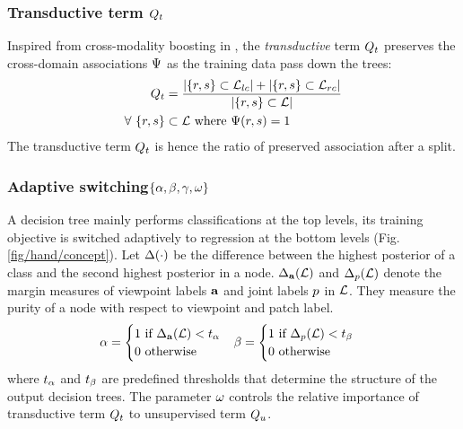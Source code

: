 \subsubsection{Transductive term $Q_{t}$} 
Inspired from cross-modality boosting in \cite{Bronstein2010}, 
the \emph{transductive} term $Q_{t}$ preserves the cross-domain associations $\mathrm{\Psi}$ as the training data pass down the trees: 
\begin{equation}
	\begin{split}
	Q_{t} &= 
	\frac{|\{r,s\} \subset \mathcal{L}_{lc}| +  
	|\{r,s\} \subset \mathcal{L}_{rc}|}{|\{r,s\} \subset \mathcal{L}|} \\   
	\forall\ \{r,s\} &\subset \mathcal{L} \mbox{ where } \mathrm{\Psi}(r,s) = 1
	\end{split}
	\label{eq:pairterm}
\end{equation}
The transductive term $Q_{t}$ is hence the ratio of preserved association after a split. \\
\subsubsection{Adaptive switching$\{\alpha, \beta, \gamma, \omega\}$} 
A decision tree mainly performs classifications at the top levels, its training objective is switched adaptively to regression at the bottom levels (Fig. \ref{fig/hand/concept}). 
Let $\Delta(\cdot)$ be the difference between the highest posterior of a class and the second highest posterior in a node. $\Delta_{\mathbf{a}}(\mathcal{L})$ and $\Delta_{p}(\mathcal{L})$ denote the margin measures of viewpoint labels $\mathbf{a}$ and joint labels $p$ in $\mathcal{L}$. They measure the purity of a node with respect to viewpoint and patch label.   
\begin{equation}
	\begin{array}{l@{}r}
	\viewparam  = 
	\begin{cases}
		1\mbox{ if } \margin_{\viewlabel}(\clset) < t_{\viewparam} \\
		0\mbox{ otherwise }
	\end{cases} & 
	\classparam = 
	\begin{cases}
		1\mbox{ if } \margin_{\jointlabel}(\clset) < t_{\classparam} \\
		0\mbox{ otherwise}
	\end{cases}
		\end{array}
	\label{eq:switchparam}
\end{equation}
where $t_{\alpha}$ and $t_{\beta}$ are predefined thresholds that determine the structure of the output decision trees. The parameter $\omega$ controls the relative importance of transductive term $Q_{t}$ to unsupervised term $Q_{u}$.  

